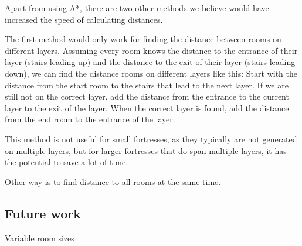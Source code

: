 Apart from using A*, there are two other methods we believe would have increased the speed of calculating distances.

The first method would only work for finding the distance between rooms on different layers. Assuming every room knows the distance to the entrance of their layer (stairs leading up) and the distance to the exit of their layer (stairs leading down), we can find the distance rooms on different layers like this: Start with the distance from the start room to the stairs that lead to the next layer. If we are still not on the correct layer, add the distance from the entrance to the current layer to the exit of the layer. When the correct layer is found, add the distance from the end room to the entrance of the layer.

This method is not useful for small fortresses, as they typically are not generated on multiple layers, but for larger fortresses that do span multiple layers, it has the potential to save a lot of time.

Other way is to find distance to all rooms at the same time.



\subsection{Future work}

Variable room sizes